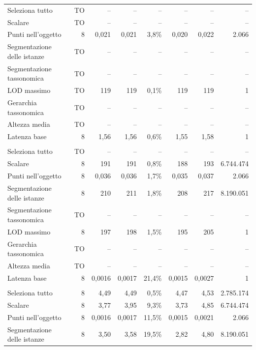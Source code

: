 \begin{small}
\begin{longtable}{lrrrrrr r}
\quad Seleziona tutto & \textsf{TO} & -- & -- & -- & -- & -- & -- \\
\quad Scalare & \textsf{TO} & -- & -- & -- & -- & -- & -- \\
\quad Punti nell'oggetto & 8 & 0,021 & 0,021 & 3,8\% & 0,020 & 0,022 & 2.066 \\
\quad Segmentazione delle istanze & \textsf{TO} & -- & -- & -- & -- & -- & -- \\
\quad Segmentazione tassonomica & \textsf{TO} & -- & -- & -- & -- & -- & -- \\
\quad LOD massimo & \textsf{TO} & 119 & 119 & 0,1\% & 119 & 119 & 1 \\
\quad Gerarchia tassonomica & \textsf{TO} & -- & -- & -- & -- & -- & -- \\
\quad Altezza media & \textsf{TO} & -- & -- & -- & -- & -- & -- \\
\quad Latenza base & 8 & 1,56 & 1,56 & 0,6\% & 1,55 & 1,58 & 1 \\
\addlinespace
\multicolumn{8}{l}{\textbf{RDFLib+BDB}}\\
\quad Seleziona tutto & \textsf{TO} & -- & -- & -- & -- & -- & -- \\
\quad Scalare & 8 & 191 & 191 & 0,8\% & 188 & 193 & 6.744.474 \\
\quad Punti nell'oggetto & 8 & 0,036 & 0,036 & 1,7\% & 0,035 & 0,037 & 2.066 \\
\quad Segmentazione delle istanze & 8 & 210 & 211 & 1,8\% & 208 & 217 & 8.190.051 \\
\quad Segmentazione tassonomica & \textsf{TO} & -- & -- & -- & -- & -- & -- \\
\quad LOD massimo & 8 & 197 & 198 & 1,5\% & 195 & 205 & 1 \\
\quad Gerarchia tassonomica & \textsf{TO} & -- & -- & -- & -- & -- & -- \\
\quad Altezza media & \textsf{TO} & -- & -- & -- & -- & -- & -- \\
\quad Latenza base & 8 & 0,0016 & 0,0017 & 21,4\% & 0,0015 & 0,0027 & 1 \\
\addlinespace
\multicolumn{8}{l}{\textbf{RDFox}}\\
\quad Seleziona tutto & 8 & 4,49 & 4,49 & 0,5\% & 4,47 & 4,53 & 2.785.174 \\
\quad Scalare & 8 & 3,77 & 3,95 & 9,3\% & 3,73 & 4,85 & 6.744.474 \\
\quad Punti nell'oggetto & 8 & 0,0016 & 0,0017 & 11,5\% & 0,0015 & 0,0021 & 2.066 \\
\quad Segmentazione delle istanze & 8 & 3,50 & 3,58 & 19,5\% & 2,82 & 4,80 & 8.190.051 \\

\end{longtable}
\end{small}
